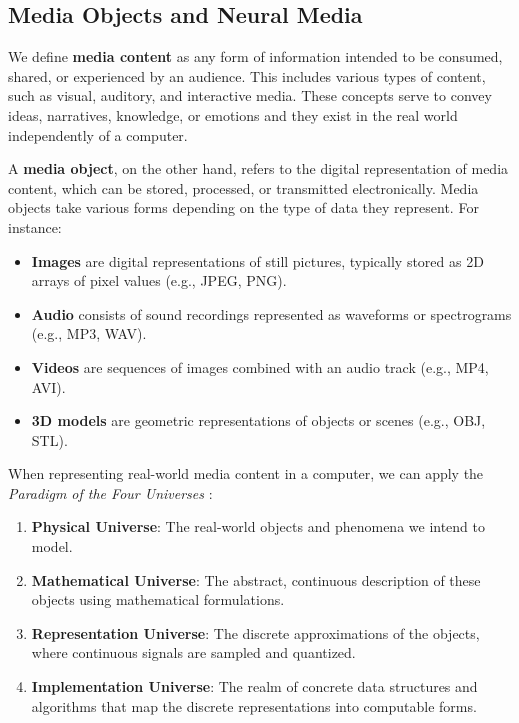 \subsection{Media Objects and Neural Media}

We define \textbf{media content} as any form of information intended to be consumed, shared, or experienced by an audience. This includes various types of content, such as visual, auditory, and interactive media. These concepts serve to convey ideas, narratives, knowledge, or emotions and they exist in the real world independently of a computer.

A \textbf{media object}, on the other hand, refers to the digital representation of media content, which can be stored, processed, or transmitted electronically. Media objects take various forms depending on the type of data they represent. For instance:

\begin{itemize}
\item \textbf{Images} are digital representations of still pictures, typically stored as 2D arrays of pixel values (e.g., JPEG, PNG).
\item \textbf{Audio} consists of sound recordings represented as waveforms or spectrograms (e.g., MP3, WAV).
\item \textbf{Videos} are sequences of images combined with an audio track (e.g., MP4, AVI).
\item \textbf{3D models} are geometric representations of objects or scenes (e.g., OBJ, STL).
\end{itemize}

When representing real-world media content in a computer, we can apply the \textit{Paradigm of the Four Universes} \citep{gomes1995}:

\begin{enumerate}
\item \textbf{Physical Universe}: The real-world objects and phenomena we intend to model.
\item \textbf{Mathematical Universe}: The abstract, continuous description of these objects using mathematical formulations.
\item \textbf{Representation Universe}: The discrete approximations of the objects, where continuous signals are sampled and quantized.
\item \textbf{Implementation Universe}: The realm of concrete data structures and algorithms that map the discrete representations into computable forms.
\end{enumerate}


